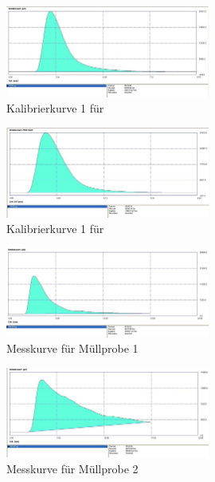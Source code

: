 \begin{figure}[h!]
	\centering
	\includegraphics[width=0.6\textwidth]{img/CaCO3_k1}
	\caption{Kalibrierkurve 1 für }
	\label{dia:k1}
\end{figure}
\FloatBarrier

\begin{figure}[h!]
	\centering
	\includegraphics[width=0.6\textwidth]{img/CaCO3_k2}
	\caption{Kalibrierkurve 1 für }
	\label{dia:k2}
\end{figure}
\FloatBarrier

\begin{figure}[h!]
	\centering
	\includegraphics[width=0.6\textwidth]{img/Muell_V1}
	\caption{Messkurve für Müllprobe 1}
	\label{dia:m1}
\end{figure}
\FloatBarrier

\begin{figure}[h!]
	\centering
	\includegraphics[width=0.6\textwidth]{img/Muell_V2}
	\caption{Messkurve für Müllprobe 2}
	\label{dia:m2}
\end{figure}
\FloatBarrier

